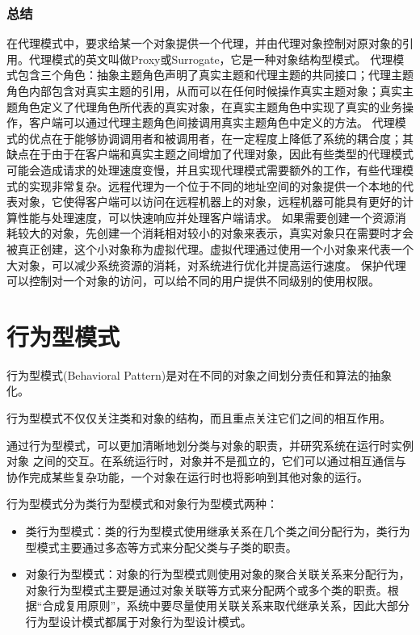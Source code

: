 \documentclass[letterpaper,10pt,english]{sphinxmanual}
\begin{document}
\subsection{总结}
\label{\detokenize{structural_patterns/proxy:id15}}
\sphinxAtStartPar
在代理模式中，要求给某一个对象提供一个代理，并由代理对象控制对原对象的引用。代理模式的英文叫做Proxy或Surrogate，它是一种对象结构型模式。
\sphinxhyphen{} 代理模式包含三个角色：抽象主题角色声明了真实主题和代理主题的共同接口；代理主题角色内部包含对真实主题的引用，从而可以在任何时候操作真实主题对象；真实主题角色定义了代理角色所代表的真实对象，在真实主题角色中实现了真实的业务操作，客户端可以通过代理主题角色间接调用真实主题角色中定义的方法。
\sphinxhyphen{} 代理模式的优点在于能够协调调用者和被调用者，在一定程度上降低了系统的耦合度；其缺点在于由于在客户端和真实主题之间增加了代理对象，因此有些类型的代理模式可能会造成请求的处理速度变慢，并且实现代理模式需要额外的工作，有些代理模式的实现非常复杂。远程代理为一个位于不同的地址空间的对象提供一个本地的代表对象，它使得客户端可以访问在远程机器上的对象，远程机器可能具有更好的计算性能与处理速度，可以快速响应并处理客户端请求。\sphinxhyphen{} 如果需要创建一个资源消耗较大的对象，先创建一个消耗相对较小的对象来表示，真实对象只在需要时才会被真正创建，这个小对象称为虚拟代理。虚拟代理通过使用一个小对象来代表一个大对象，可以减少系统资源的消耗，对系统进行优化并提高运行速度。
\sphinxhyphen{} 保护代理可以控制对一个对象的访问，可以给不同的用户提供不同级别的使用权限。

\sphinxstepscope


\chapter{行为型模式}
\label{\detokenize{behavioral_patterns/behavioral:behavioral}}\label{\detokenize{behavioral_patterns/behavioral:id1}}\label{\detokenize{behavioral_patterns/behavioral::doc}}
\sphinxAtStartPar
行为型模式(Behavioral Pattern)是对在不同的对象之间划分责任和算法的抽象化。

\sphinxAtStartPar
行为型模式不仅仅关注类和对象的结构，而且重点关注它们之间的相互作用。

\sphinxAtStartPar
通过行为型模式，可以更加清晰地划分类与对象的职责，并研究系统在运行时实例对象
之间的交互。在系统运行时，对象并不是孤立的，它们可以通过相互通信与协作完成某些复杂功能，一个对象在运行时也将影响到其他对象的运行。

\sphinxAtStartPar
行为型模式分为类行为型模式和对象行为型模式两种：
\begin{itemize}
\item {} 
\sphinxAtStartPar
类行为型模式：类的行为型模式使用继承关系在几个类之间分配行为，类行为型模式主要通过多态等方式来分配父类与子类的职责。

\item {} 
\sphinxAtStartPar
对象行为型模式：对象的行为型模式则使用对象的聚合关联关系来分配行为，对象行为型模式主要是通过对象关联等方式来分配两个或多个类的职责。根据“合成复用原则”，系统中要尽量使用关联关系来取代继承关系，因此大部分行为型设计模式都属于对象行为型设计模式。

\end{itemize}
\end{document}
